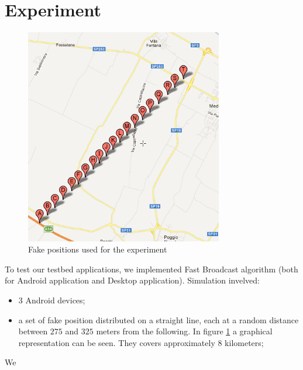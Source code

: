 \section{Experiment}
	\begin{figure}[htbp]
	\centering
	\includegraphics[width=3.4in]{imgs/punti_mappa.png}
	\caption{Fake positions used for the experiment}
	\label{fig:positions_experiment}
	\end{figure}

To test our testbed applications, we implemented Fast Broadcast algorithm (both for Android application and Desktop application). Simulation invelved:
\begin{itemize}
	\item 3 Android devices;
	\item a set of fake position distributed on a straight line, each at a random distance between $275$ and $325$ meters from the following. In figure \ref{fig:positions_experiment} a graphical representation can be seen. They covers approximately $8$ kilometers;
\end{itemize}

We 

